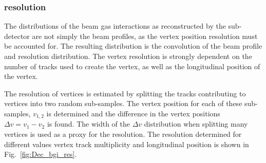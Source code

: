 \subsubsection{\velo resolution}

The distributions of the beam gas interactions as reconstructed by the \velo sub-detector are not simply the beam profiles, as the vertex position resolution must be accounted for. The resulting distribution is the convolution of the beam profile and resolution distribution. The \velo vertex resolution is strongly dependent on the number of tracks used to create the vertex, as well as the longitudinal position of the vertex. 

The resolution of vertices is estimated by splitting the tracks contributing to vertices into two random sub-samples. The vertex position for each of these sub-samples, $v_{1,2}$ is determined and the difference in the vertex positions $\Delta v = v_{1}-v_{2}$ is found. The width of the $\Delta v$ distribution when splitting many vertices is used as a proxy for the resolution. 
The resolution determined for different values vertex track multiplicity and longitudinal position is shown in Fig.~\ref{fig:Dec_bgi_res}.
